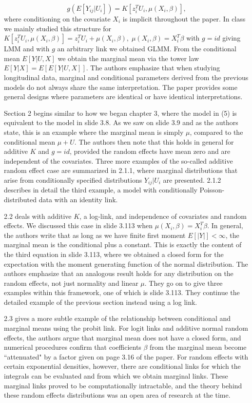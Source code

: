 \documentclass[11pt]{article}
\begin{document}
\begin{enumerate}
{	\[
		g(E[Y_{ij}|U_i]) = K[z_i^TU_i, \mu(X_i,\beta)],
	\]
	where conditioning on the covariate $X_i$ is implicit throughout the paper. In class we mainly studied this structure for $K[z_i^TU_i, \mu(X_i,\beta)] = z_i^TU_i + \mu(X_i,\beta),\; \mu(X_i,\beta) = X_i^T\beta$ with $g=id$ giving LMM and with $g$ an arbitrary link we obtained GLMM. From the conditional mean $E[Y|U,X]$ we obtain the marginal mean via the tower law $E[Y|X]=E[E[Y|U,X]]$. The authors emphasize that when studying longitudinal data, marginal and conditional parameters derived from the previous models do not always share the same interpretation. The paper provides some general designs where parameters are identical or have identical interpretations.
	
	Section 2 begins similar to how we began chapter 3, where the model in (5) is equivalent to the model in slide 3.8. As we saw on slide 3.9 and as the authors state, this is an example where the marginal mean is simply $\mu$, compared to the conditional mean $\mu+U$. The authors then note that this holds in general for additive $K$ and $g=id$, provided the random effects have mean zero and are independent of the covariates. Three more examples of the so-called additive random effect case are summarized in 2.1.1, where marginal distributions that arise from conditionally specified distributions $Y_{ij}|U_i$ are presented. 2.1.2 describes in detail the third example, a model with conditionally Poisson-distributed data with an identity link. 
	
	 2.2 deals with additive $K$, a log-link, and independence of covariates and random effects. We discussed this case in slide 3.113 when $\mu(X_i,\beta)=X_i^T\beta$. In general, the authors write that as long as we have finite first moment $E[|Y|]<\infty$, the marginal mean is the conditional plus a constant. This is exactly the content of the third equation in slide 3.113, where we obtained a closed form for the expectation with the moment generating function of the normal distribution. The authors emphasize that an analogous result holds for any distribution on the random effects, not just normality and linear $\mu$. They go on to give three examples within this framework, one of which is slide 3.113. They continue the detailed example of the previous section instead using a log link.
	
	 2.3 gives a more subtle example of the relationship between conditional and marginal means using the probit link. For logit links and additive normal random effects, the authors argue that marginal mean does not have a closed form, and numerical procedures confirm that coefficients $\beta$ from the marginal mean become ``attenuated" by a factor given on page 3.16 of the paper. For random effects with certain exponential densities, however, there are conditional links for which the integrals can be evaluated and from which we obtain marginal links. These marginal links proved to be computationally intractable, and the theory behind these random effects distributions was an open area of research at the time. 
	 
}
\end{enumerate}
\end{document}
